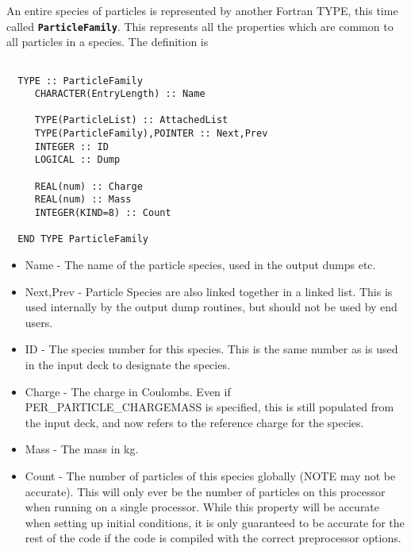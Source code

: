 \documentclass[12pt]{article}
\newcommand{\simpleboxverbatim}{\begin{Verbatim}[obeytabs=true,frame=single,
  framerule=0.5mm,rulecolor=\color{warwickmid}]}
\newcommand{\inlinecode}[1]{{\color{warwickred} \bf\texttt{#1}}}
\begin{document}
An entire species of particles is represented by another Fortran TYPE, this
time called \inlinecode{ParticleFamily}. This represents all the properties
which are common to all particles in a species. The definition is

\simpleboxverbatim

  TYPE :: ParticleFamily
     CHARACTER(EntryLength) :: Name

     TYPE(ParticleList) :: AttachedList
     TYPE(ParticleFamily),POINTER :: Next,Prev
     INTEGER :: ID
     LOGICAL :: Dump

     REAL(num) :: Charge
     REAL(num) :: Mass
     INTEGER(KIND=8) :: Count

  END TYPE ParticleFamily

\end{Verbatim}

\begin{itemize}
\item Name - The name of the particle species, used in the output dumps etc.
\item Next,Prev - Particle Species are also linked together in a linked
  list. This is used internally by the output dump routines, but should not be
  used by end users.
\item ID - The species number for this species. This is the same number as is
  used in the input deck to designate the species.
\item Charge - The charge in Coulombs. Even if PER\_PARTICLE\_CHARGEMASS is
  specified, this is still populated from the input deck, and now refers to
  the reference charge for the species.
\item Mass - The mass in kg.
\item Count - The number of particles of this species globally (NOTE may not
  be accurate). This will only ever be the number of particles on this
  processor when running on a single processor. While this property will be
  accurate when setting up initial conditions, it is only guaranteed to be
  accurate for the rest of the code if the code is compiled with the correct
  preprocessor options.
\end{itemize}
\end{document}
